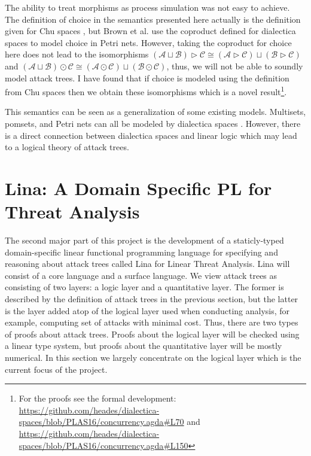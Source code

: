 \documentclass{sigplanconf}
\newcommand{\cat}[1]{\mathcal{#1}}
\begin{document}
The ability to treat morphisms as process simulation was not easy to
achieve.  The definition of choice in the semantics presented here
actually is the definition given for Chu spaces \cite{Gupta:1994}, but
Brown et al. use the coproduct defined for dialectica spaces to model
choice in Petri nets.  However, taking the coproduct for choice here
does not lead to the isomorphisms $(\cat{A} \sqcup \cat{B}) \rhd
\cat{C} \cong (\cat{A} \rhd \cat{C}) \sqcup (\cat{B} \rhd \cat{C})$
and $(\cat{A} \sqcup \cat{B}) \odot \cat{C} \cong (\cat{A} \odot
\cat{C}) \sqcup (\cat{B} \odot \cat{C})$, thus, we will not be able to
soundly model attack trees.  I have found that if choice is modeled
using the definition from Chu spaces \cite{Gupta:1994} then we obtain
these isomorphisms which is a novel result\footnote{For the proofs see
  the formal development:
  \url{https://github.com/heades/dialectica-spaces/blob/PLAS16/concurrency.agda\#L70}
  and
  \url{https://github.com/heades/dialectica-spaces/blob/PLAS16/concurrency.agda\#L150}}.

This semantics can be seen as a generalization of some existing
models.  Multisets, pomsets, and Petri nets can all be modeled by
dialectica spaces \cite{Brown:1991,Gupta:1994}.  However, there is a
direct connection between dialectica spaces and linear logic which
may lead to a logical theory of attack trees.

\section{Lina: A Domain Specific PL for Threat Analysis}
\label{sec:lina:_a_domain_specific_pl_for_threat_analysis}

The second major part of this project is the development of a
staticly-typed domain-specific linear functional programming language
for specifying and reasoning about attack trees called Lina for Linear
Threat Analysis.  Lina will consist of a core language and a surface
language.  We view attack trees as consisting of two layers: a logic
layer and a quantitative layer.  The former is described by the
definition of attack trees in the previous section, but the latter is
the layer added atop of the logical layer used when conducting
analysis, for example, computing set of attacks with minimal cost.
Thus, there are two types of proofs about attack trees.  Proofs about
the logical layer will be checked using a linear type system, but
proofs about the quantitative layer will be mostly numerical. In this
section we largely concentrate on the logical layer which is the
current focus of the project.
\end{document}
